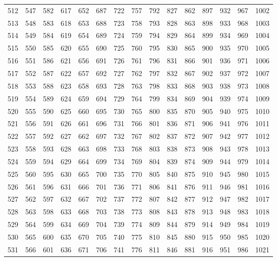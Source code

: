 \documentclass{assignment}
\begin{document}
\begin{tabular}{r r r r r r r r r r r r r r r}
512 & 547 & 582 & 617 & 652 & 687 & 722 & 757 & 792 & 827 & 862 & 897 & 932 & 967 & 1002 \\
513 & 548 & 583 & 618 & 653 & 688 & 723 & 758 & 793 & 828 & 863 & 898 & 933 & 968 & 1003 \\
514 & 549 & 584 & 619 & 654 & 689 & 724 & 759 & 794 & 829 & 864 & 899 & 934 & 969 & 1004 \\
515 & 550 & 585 & 620 & 655 & 690 & 725 & 760 & 795 & 830 & 865 & 900 & 935 & 970 & 1005 \\
516 & 551 & 586 & 621 & 656 & 691 & 726 & 761 & 796 & 831 & 866 & 901 & 936 & 971 & 1006 \\
517 & 552 & 587 & 622 & 657 & 692 & 727 & 762 & 797 & 832 & 867 & 902 & 937 & 972 & 1007 \\
518 & 553 & 588 & 623 & 658 & 693 & 728 & 763 & 798 & 833 & 868 & 903 & 938 & 973 & 1008 \\
519 & 554 & 589 & 624 & 659 & 694 & 729 & 764 & 799 & 834 & 869 & 904 & 939 & 974 & 1009 \\
520 & 555 & 590 & 625 & 660 & 695 & 730 & 765 & 800 & 835 & 870 & 905 & 940 & 975 & 1010 \\
521 & 556 & 591 & 626 & 661 & 696 & 731 & 766 & 801 & 836 & 871 & 906 & 941 & 976 & 1011 \\
522 & 557 & 592 & 627 & 662 & 697 & 732 & 767 & 802 & 837 & 872 & 907 & 942 & 977 & 1012 \\
523 & 558 & 593 & 628 & 663 & 698 & 733 & 768 & 803 & 838 & 873 & 908 & 943 & 978 & 1013 \\
524 & 559 & 594 & 629 & 664 & 699 & 734 & 769 & 804 & 839 & 874 & 909 & 944 & 979 & 1014 \\
525 & 560 & 595 & 630 & 665 & 700 & 735 & 770 & 805 & 840 & 875 & 910 & 945 & 980 & 1015 \\
526 & 561 & 596 & 631 & 666 & 701 & 736 & 771 & 806 & 841 & 876 & 911 & 946 & 981 & 1016 \\
527 & 562 & 597 & 632 & 667 & 702 & 737 & 772 & 807 & 842 & 877 & 912 & 947 & 982 & 1017 \\
528 & 563 & 598 & 633 & 668 & 703 & 738 & 773 & 808 & 843 & 878 & 913 & 948 & 983 & 1018 \\
529 & 564 & 599 & 634 & 669 & 704 & 739 & 774 & 809 & 844 & 879 & 914 & 949 & 984 & 1019 \\
530 & 565 & 600 & 635 & 670 & 705 & 740 & 775 & 810 & 845 & 880 & 915 & 950 & 985 & 1020 \\
531 & 566 & 601 & 636 & 671 & 706 & 741 & 776 & 811 & 846 & 881 & 916 & 951 & 986 & 1021 \\

\end{tabular}
\end{document}
